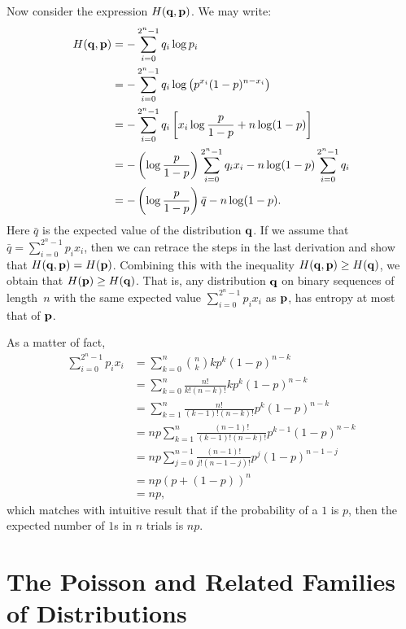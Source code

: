 Now consider the expression $H(\mathbf{q}, \mathbf{p})$. We may write:
\begin{align*}
    H(\mathbf{q}, \mathbf{p}) & = - \sum_{i = 0}^{2^n - 1} q_i \log p_i \\
        & = - \sum_{i = 0}^{2^n - 1} q_i \log \left ( p^{x_i} (1 - p)^{n - x_i} \right ) \\
        & = - \sum_{i = 0}^{2^n - 1} q_i \left [ x_i \log \frac{p}{1 - p} + n \log (1 - p) \right ] \\
        & = - \left ( \log \frac{p}{1 - p} \right ) \sum_{i = 0}^{2^n - 1} q_i x_i - n \log (1 - p) \sum_{i = 0}^{2^n - 1} q_i \\
        & = - \left ( \log \frac{p}{1 - p} \right ) \bar{q} - n \log (1 - p).
\end{align*}
Here $\bar{q}$ is the expected value of the distribution $\mathbf{q}$. If we assume that
$\bar{q} = \sum_{i = 0}^{2^n - 1} p_i x_i$, then we can retrace
the steps in the last derivation and show that $H(\mathbf{q}, \mathbf{p}) = H(\mathbf{p})$. Combining this with the
inequality $H(\mathbf{q}, \mathbf{p}) \geq H(\mathbf{q})$, we obtain that $H(\mathbf{p}) \geq H(\mathbf{q})$. That is, any
distribution $\mathbf{q}$ on binary sequences of length~$n$ with the same expected value $\sum_{i = 0}^{2^n - 1} p_i x_i$
as $\mathbf{p}$, has entropy at most that of $\mathbf{p}$.

As a matter of fact,
\begin{align*}
    \sum_{i = 0}^{2^n - 1} p_i x_i
        & = \sum_{k = 0}^{n} {n \choose k} k p^k (1 - p)^{n - k} \\
        & = \sum_{k = 0}^{n} \frac{n!}{k! (n - k)!} k p^k (1 - p)^{n - k} \\
        & = \sum_{k = 1}^{n} \frac{n!}{(k - 1)! (n - k)!} p^k (1 - p)^{n - k} \\
        & = np \sum_{k = 1}^{n} \frac{(n - 1)!}{(k - 1)! (n - k)!} p^{k - 1} (1 - p)^{n - k} \\
        & =  np \sum_{j = 0}^{n - 1} \frac{(n - 1)!}{j! (n - 1 - j)!} p^{j} (1 - p)^{n - 1 - j} \\
        & = np \left ( p + (1 - p) \right )^n \\
        & = np,
\end{align*}
which matches with intuitive result that if the probability of a $1$ is $p$, then the expected
number of $1$s in $n$ trials is $np$.

\section{The Poisson and Related Families of Distributions}


